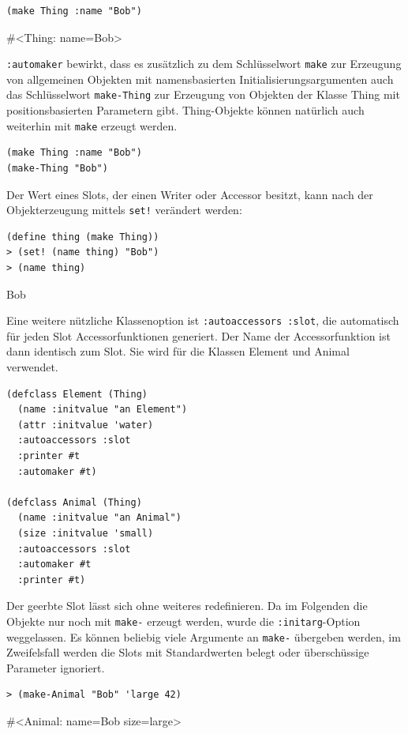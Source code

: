 \begin{lstlisting}
(make Thing :name "Bob")
\end{lstlisting}
{\routput \#<Thing: name={\qq}Bob\qq>}

\texttt{:automaker} bewirkt, dass es zusätzlich zu dem Schlüsselwort \texttt{make} zur Erzeugung von allgemeinen Objekten mit namensbasierten Initialisierungsargumenten auch das Schlüsselwort \texttt{make-Thing} zur Erzeugung von Objekten der Klasse Thing mit positionsbasierten Parametern gibt. Thing-Objekte können natürlich auch weiterhin mit \texttt{make} erzeugt werden.

\begin{lstlisting}
(make Thing :name "Bob")
(make-Thing "Bob")
\end{lstlisting}

Der Wert eines Slots, der einen Writer oder Accessor besitzt, kann nach der Objekterzeugung mittels \texttt{set!} verändert werden:

\begin{lstlisting}
(define thing (make Thing))
> (set! (name thing) "Bob")
> (name thing)
\end{lstlisting}
{\routput {\qq}Bob\qq}

Eine weitere nützliche Klassenoption ist \texttt{:autoaccessors :slot}, die automatisch für jeden Slot Accessorfunktionen generiert. Der Name der Accessorfunktion ist dann identisch zum Slot. Sie wird für die Klassen Element und Animal verwendet.

\begin{lstlisting}
(defclass Element (Thing)
  (name :initvalue "an Element") 
  (attr :initvalue 'water)
  :autoaccessors :slot 
  :printer #t          
  :automaker #t)
  
(defclass Animal (Thing)
  (name :initvalue "an Animal")      
  (size :initvalue 'small)
  :autoaccessors :slot
  :automaker #t
  :printer #t)
\end{lstlisting}

Der geerbte Slot lässt sich ohne weiteres redefinieren. Da im Folgenden die Objekte nur noch mit \texttt{make-} erzeugt werden, wurde die \texttt{:initarg}-Option weggelassen. Es können beliebig viele Argumente an \texttt{make-} übergeben werden, im Zweifelsfall werden die Slots mit Standardwerten belegt oder überschüssige Parameter ignoriert.

\begin{lstlisting}
> (make-Animal "Bob" 'large 42)
\end{lstlisting}
{\routput \#<Animal: name={\qq}Bob{\qq} size=large>}

